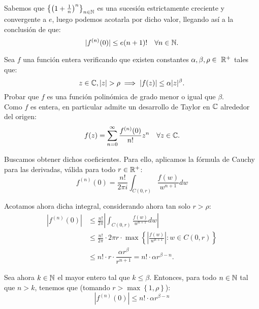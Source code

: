 \begin{ejercicio}
    Sabemos que $\left\{\left(1+\frac{1}{n}\right)^n\right\}_{n\in \mathbb{N}}$ es una sucesión estrictamente creciente y convergente a $e$, luego podemos acotarla por dicho valor, llegando así a la conclusión de que:
    \begin{equation*}
        |f^{(n)}(0)|\leq e(n+1)! \quad \forall n\in \mathbb{N}.
    \end{equation*}
\end{ejercicio}

\begin{ejercicio}\label{ej:9.2}
    Sea $f$ una función entera verificando que existen constantes $\alpha,\beta,\rho\in~\mathbb{R}^+$ tales que:
    \begin{equation*}
        z\in \bb{C}, |z|>\rho \implies |f(z)|\leq \alpha |z|^\beta.
    \end{equation*}
    Probar que $f$ es una función polinómica de grado menor o igual que $\beta$.\\

    Como $f$ es entera, en particular admite un desarrollo de Taylor en $\mathbb{C}$ alrededor del origen:
    \begin{equation*}
        f(z)=\sum_{n=0}^{\infty} \dfrac{f^{(n)}(0)}{n!} z^n \quad \forall z\in \mathbb{C}.
    \end{equation*}

    Buscamos obtener dichos coeficientes. Para ello, aplicamos la fórmula de Cauchy para las derivadas, válida para todo $r\in \mathbb{R}^+$:
    \begin{equation*}
        f^{(n)}(0)=\frac{n!}{2\pi i} \int_{C(0,r)} \frac{f(w)}{w^{n+1}} dw
    \end{equation*}

    Acotamos ahora dicha integral, considerando ahora tan solo $r>\rho$:
    \begin{align*}
        |f^{(n)}(0)| &\leq \frac{n!}{2\pi} \left| \int_{C(0,r)} \frac{f(w)}{w^{n+1}} dw \right| \\
        &\leq \frac{n!}{2\pi}\cdot 2\pi r\cdot \max\left\{ \left| \frac{f(w)}{w^{n+1}} \right| : w\in C(0,r) \right\} \\
        &\leq n!\cdot r\cdot \dfrac{\alpha r^\beta}{r^{n+1}} = n!\cdot \alpha r^{\beta-n}.
    \end{align*}

    Sea ahora $k\in \mathbb{N}$ el mayor entero tal que $k\leq \beta$. Entonces, para todo $n\in \mathbb{N}$ tal que $n>k$, tenemos que (tomando $r > \max\left\{1,\rho \right\}$):
    \begin{equation*}
        |f^{(n)}(0)|\leq n!\cdot \alpha r^{\beta-n}
    \end{equation*}


\end{ejercicio}
